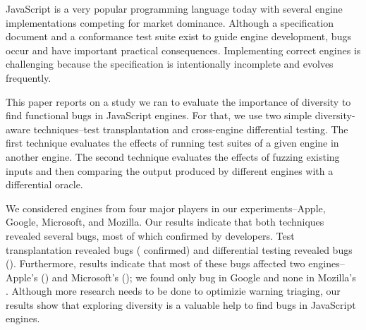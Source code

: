 JavaScript is a very popular programming language today with several
engine implementations competing for market dominance. Although a
specification document and a conformance test suite exist to guide
engine development, bugs occur and have important practical
consequences. Implementing correct
engines is challenging because the specification is intentionally
incomplete and evolves frequently.

This paper reports on a study we ran to evaluate the importance of
diversity to find functional bugs in JavaScript engines. For that, we use two
simple diversity-aware techniques--test transplantation and cross-engine
differential testing. The first technique evaluates the effects of
running test suites of a given engine in another engine. The second technique evaluates the effects of fuzzing existing inputs
and then comparing the output produced by different engines with a
differential oracle.

We considered engines from four major players in our
experiments--Apple, Google, Microsoft, and Mozilla. Our results
indicate that both techniques revealed several bugs, most of which
confirmed by developers. Test transplantation
revealed \noBugsTransplantation{} bugs
(\noBugsTransplantationConfirmed{} confirmed) and differential testing
revealed \noBugsDifferentialTesting{} bugs
(\noBugsDifferentialTestingConfirmed{}). Furthermore, results indicate
that most of these bugs affected two engines--Apple's
\jsc{} (\percJSC{}) and Microsoft's \chakra{} (\percChakra{}); we found
only  bug in Google \veight{} and none in Mozilla's
\smonkey{}. Although more research needs to be done to optimizie 
warning triaging, our results show that exploring diversity is a
valuable help to find bugs in JavaScript engines.
